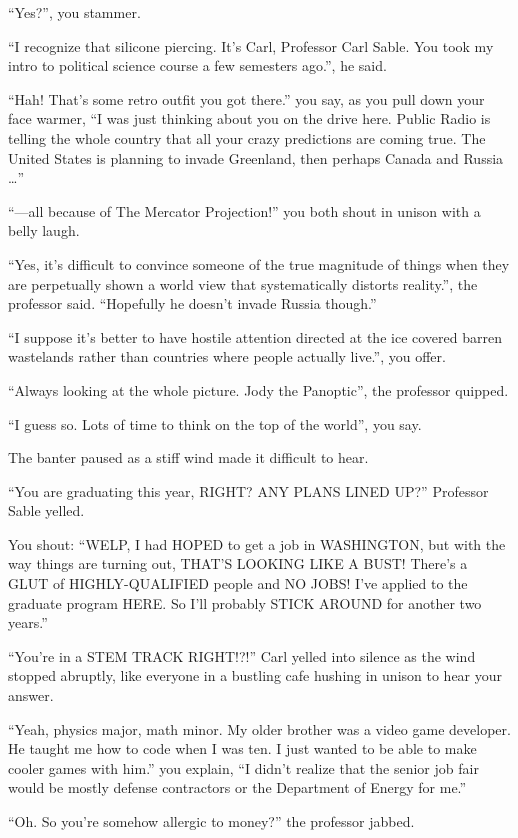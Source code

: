 \documentclass[17pt, twoside, a5paper, openright, extrafontsizes]{memoir}
\begin{document}
``Yes?'', you stammer.

``I recognize that silicone piercing. It's Carl, Professor Carl Sable.
You took my intro to political science course a few semesters ago.'', he
said.

``Hah! That's some retro outfit you got there.'' you say, as you pull
down your face warmer, ``I was just thinking about you on the drive
here. Public Radio is telling the whole country that all your crazy
predictions are coming true. The United States is planning to invade
Greenland, then perhaps Canada and Russia \ldots{}''

``---all because of The Mercator Projection!'' you both shout in unison
with a belly laugh.

``Yes, it's difficult to convince someone of the true magnitude of
things when they are perpetually shown a world view that systematically
distorts reality.'', the professor said. ``Hopefully he doesn't invade
Russia though.''

``I suppose it's better to have hostile attention directed at the ice
covered barren wastelands rather than countries where people actually
live.'', you offer.

``Always looking at the whole picture. Jody the Panoptic'', the
professor quipped.

``I guess so. Lots of time to think on the top of the world'', you say.

The banter paused as a stiff wind made it difficult to hear.

``You are graduating this year, RIGHT? ANY PLANS LINED UP?'' Professor
Sable yelled.

You shout: ``WELP, I had HOPED to get a job in WASHINGTON, but with the
way things are turning out, THAT'S LOOKING LIKE A BUST! There's a GLUT
of HIGHLY-QUALIFIED people and NO JOBS! I've applied to the graduate
program HERE. So I'll probably STICK AROUND for another two years.''

``You're in a STEM TRACK RIGHT!?!'' Carl yelled into silence as the wind
stopped abruptly, like everyone in a bustling cafe hushing in unison to
hear your answer.

``Yeah, physics major, math minor. My older brother was a video game
developer. He taught me how to code when I was ten. I just wanted to be
able to make cooler games with him.'' you explain, ``I didn't realize
that the senior job fair would be mostly defense contractors or the
Department of Energy for me.''

``Oh. So you're somehow allergic to money?'' the professor jabbed.
\end{document}

